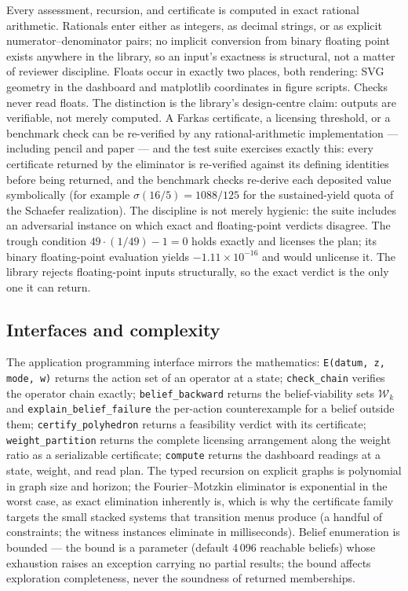 \documentclass[3p,11pt]{elsarticle}
\begin{document}
Every assessment, recursion, and certificate is computed in exact rational
arithmetic. Rationals enter either as integers, as decimal strings, or as
explicit numerator--denominator pairs; no implicit conversion from binary
floating point exists anywhere in the library, so an input's exactness is
structural, not a matter of reviewer discipline. Floats occur in exactly two
places, both rendering: SVG geometry in the dashboard and matplotlib
coordinates in figure scripts. Checks never read floats. The distinction is
the library's design-centre claim: outputs are verifiable, not merely
computed. A Farkas certificate, a licensing threshold, or a benchmark check
can be re-verified by any rational-arithmetic implementation --- including
pencil and paper --- and the test suite exercises exactly this: every
certificate returned by the eliminator is re-verified against its defining
identities before being returned, and the benchmark checks re-derive each
deposited value symbolically (for example $\sigma(16/5) = 1088/125$ for the
sustained-yield quota of the Schaefer realization). The discipline is not
merely hygienic: the suite includes an adversarial instance on which exact
and floating-point verdicts disagree. The trough condition
$49 \cdot (1/49) - 1 = 0$ holds exactly and licenses the plan; its binary
floating-point evaluation yields $-1.11 \times 10^{-16}$ and would
unlicense it. The library rejects floating-point inputs structurally, so
the exact verdict is the only one it can return.

\subsection{Interfaces and complexity}\label{sec:api}

The application programming interface mirrors the mathematics:
\texttt{E(datum, z, mode, w)} returns the action set of an operator at a
state; \texttt{check\_chain} verifies the operator chain exactly;
\texttt{belief\_backward} returns the belief-viability sets
$\mathcal{W}_k$ and \texttt{explain\_belief\_failure} the per-action
counterexample for a belief outside them; \texttt{certify\_polyhedron}
returns a feasibility verdict with its certificate;
\texttt{weight\_partition} returns the complete licensing arrangement along
the weight ratio as a serializable certificate;
\texttt{compute} returns the dashboard readings at a
state, weight, and read plan. The typed recursion on explicit graphs is
polynomial in graph size and horizon; the Fourier--Motzkin eliminator is
exponential in the worst case, as exact elimination inherently is, which is
why the certificate family targets the small stacked systems that transition
menus produce (a handful of constraints; the witness instances eliminate in
milliseconds). Belief enumeration is bounded --- the bound is a parameter
(default 4\,096 reachable beliefs) whose exhaustion raises an exception
carrying no partial results; the bound affects exploration completeness,
never the soundness of returned memberships.
\end{document}

